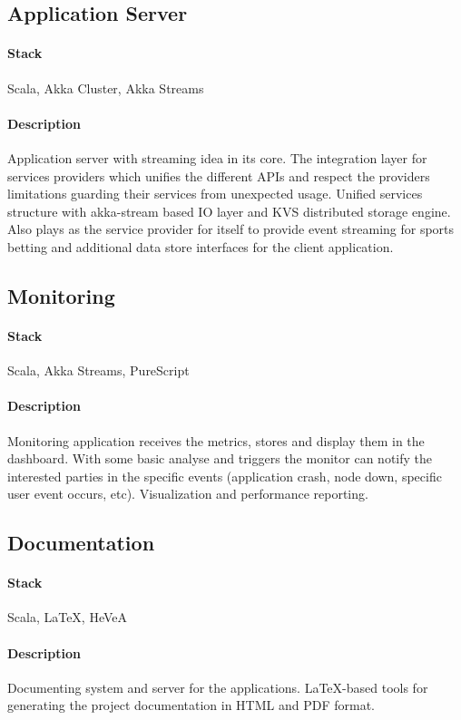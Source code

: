 \subsection{Application Server}
\paragraph{Stack} Scala, Akka Cluster, Akka Streams
\paragraph{Description}
Application server with streaming idea in its core. The integration layer for services providers which unifies the different APIs and respect the providers limitations guarding their services from unexpected usage. Unified services structure with akka-stream based IO layer and KVS distributed storage engine. Also plays as the service provider for itself to provide event streaming for sports betting and additional data store interfaces for the client application.

\subsection{Monitoring}
\paragraph{Stack} Scala, Akka Streams, PureScript
\paragraph{Description}
Monitoring application receives the metrics, stores and display them in the dashboard. With some basic analyse and triggers the monitor can notify the interested parties in the specific events (application crash, node down, specific user event occurs, etc). Visualization and performance reporting.

\subsection{Documentation}
\paragraph{Stack} Scala, LaTeX, HeVeA
\paragraph{Description}
Documenting system and server for the applications. LaTeX-based tools for generating the project documentation in HTML and PDF format.

